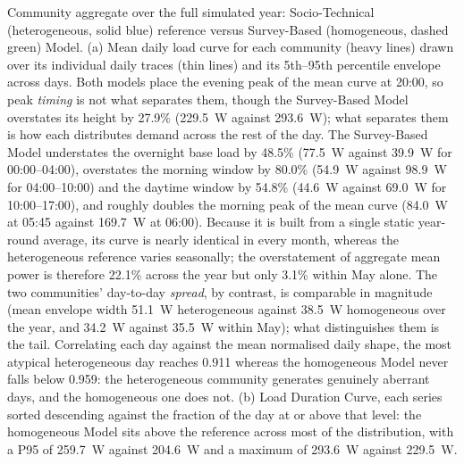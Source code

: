 \caption{Community aggregate over the full simulated year: Socio-Technical
(heterogeneous, solid blue) reference versus Survey-Based (homogeneous, dashed
green) Model. (a) Mean daily load curve for each community (heavy lines) drawn
over its individual daily traces (thin lines) and its 5th--95th percentile
envelope across days. Both models place the evening peak of the mean curve at
20:00, so peak \emph{timing} is not what separates them, though the
Survey-Based Model overstates its height by 27.9\% (229.5~W against 293.6~W);
what separates them is how each distributes demand across the rest of the day.
The Survey-Based Model understates the overnight base load by 48.5\% (77.5~W
against 39.9~W for 00:00--04:00), overstates the morning window by 80.0\%
(54.9~W against 98.9~W for 04:00--10:00) and the daytime window by 54.8\%
(44.6~W against 69.0~W for 10:00--17:00), and roughly doubles the morning peak
of the mean curve (84.0~W at 05:45 against 169.7~W at 06:00). Because it is
built from a single static year-round average, its curve is nearly identical
in every month, whereas the heterogeneous reference varies seasonally; the
overstatement of aggregate mean power is therefore 22.1\% across the year but
only 3.1\% within May alone. The two communities' day-to-day \emph{spread}, by
contrast, is comparable in magnitude (mean envelope width 51.1~W heterogeneous
against 38.5~W homogeneous over the year, and 34.2~W against 35.5~W within
May); what distinguishes them is the tail. Correlating each day against the
mean normalised daily shape, the most atypical heterogeneous day reaches 0.911
whereas the homogeneous Model never falls below 0.959: the heterogeneous
community generates genuinely aberrant days, and the homogeneous one does not.
(b) Load Duration Curve, each series sorted descending against the fraction of
the day at or above that level: the homogeneous Model sits above the reference
across most of the distribution, with a P95 of 259.7~W against 204.6~W and a
maximum of 293.6~W against 229.5~W.}
\label{fig:community_ldc_envelope}


